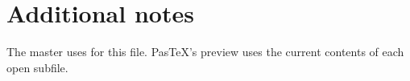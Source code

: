 \section{Additional notes}
The master uses \verb|| for this file.
PasTeX's preview uses the current contents of each open subfile.

